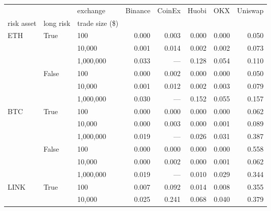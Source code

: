 \begin{tabular}{lllrrrrr}
    \toprule
                          &                        & exchange        & Binance & CoinEx & Huobi & OKX   & Uniswap \\
    risk asset            & long risk              & trade size (\$) &         &        &       &       &         \\
    \midrule
    \multirow{6}{*}{ETH}  & \multirow{3}{*}{True}  & 100             & 0.000   & 0.003  & 0.000 & 0.000 & 0.050   \\
                          &                        & 10,000          & 0.001   & 0.014  & 0.002 & 0.002 & 0.073   \\
                          &                        & 1,000,000       & 0.033   & ---    & 0.128 & 0.054 & 0.110   \\
    \cline{2-8}
                          & \multirow{3}{*}{False} & 100             & 0.000   & 0.002  & 0.000 & 0.000 & 0.050   \\
                          &                        & 10,000          & 0.001   & 0.012  & 0.002 & 0.003 & 0.079   \\
                          &                        & 1,000,000       & 0.030   & ---    & 0.152 & 0.055 & 0.157   \\
    \cline{1-8}
    \cline{2-8}
    \multirow{6}{*}{BTC}  & \multirow{3}{*}{True}  & 100             & 0.000   & 0.000  & 0.000 & 0.000 & 0.062   \\
                          &                        & 10,000          & 0.000   & 0.003  & 0.000 & 0.001 & 0.089   \\
                          &                        & 1,000,000       & 0.019   & ---    & 0.026 & 0.031 & 0.387   \\
    \cline{2-8}
                          & \multirow{3}{*}{False} & 100             & 0.000   & 0.000  & 0.000 & 0.000 & 0.558   \\
                          &                        & 10,000          & 0.000   & 0.002  & 0.000 & 0.001 & 0.062   \\
                          &                        & 1,000,000       & 0.019   & ---    & 0.010 & 0.029 & 0.344   \\
    \cline{1-8}
    \cline{2-8}
    \multirow{6}{*}{LINK} & \multirow{3}{*}{True}  & 100             & 0.007   & 0.092  & 0.014 & 0.008 & 0.355   \\
                          &                        & 10,000          & 0.025   & 0.241  & 0.068 & 0.040 & 0.379   \\

\end{tabular}
